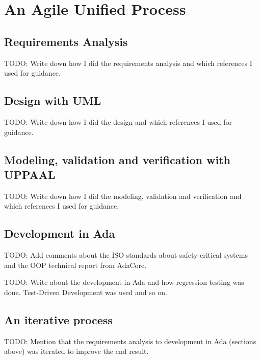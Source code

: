 \section{An Agile Unified Process}
\subsection{Requirements Analysis}
TODO: Write down how I did the requirements analysis and which references I
used for guidance.

\subsection{Design with UML}
TODO: Write down how I did the design and which references I used for guidance.

\subsection{Modeling, validation and verification with UPPAAL}
TODO: Write down how I did the modeling, validation and verification and which
references I used for guidance.

\subsection{Development in Ada}
TODO: Add comments about the ISO standards about safety-critical systems and
the OOP technical report from AdaCore.

TODO: Write about the development in Ada and how regression testing was done.
Test-Driven Development was used and so on.

\subsection{An iterative process}
TODO: Mention that the requirements analysis to development in Ada (sections
above) was iterated to improve the end result.
